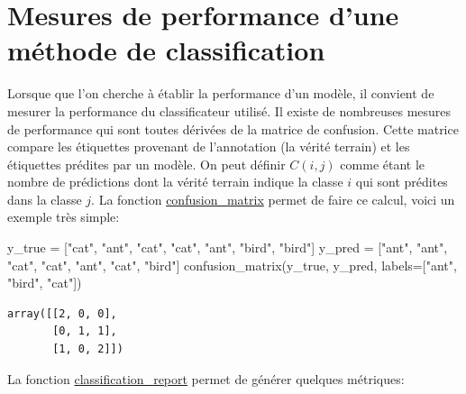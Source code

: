 \documentclass[
  11pt,
  letterpaper,
  open=any,
  twoside=false,
  french]{scrbook}
\newenvironment{Shaded}{\begin{snugshade}}{\end{snugshade}}
\newcommand{\NormalTok}[1]{\textcolor[rgb]{0.00,0.23,0.31}{#1}}
\newcommand{\OperatorTok}[1]{\textcolor[rgb]{0.37,0.37,0.37}{#1}}
\newcommand{\StringTok}[1]{\textcolor[rgb]{0.13,0.47,0.30}{#1}}
\begin{document}
\section{Mesures de performance d'une méthode de
classification}\label{mesures-de-performance-dune-muxe9thode-de-classification}

Lorsque que l'on cherche à établir la performance d'un modèle, il
convient de mesurer la performance du classificateur utilisé. Il existe
de nombreuses mesures de performance qui sont toutes dérivées de la
matrice de confusion. Cette matrice compare les étiquettes provenant de
l'annotation (la vérité terrain) et les étiquettes prédites par un
modèle. On peut définir \(C(i,j)\) comme étant le nombre de prédictions
dont la vérité terrain indique la classe \(i\) qui sont prédites dans la
classe \(j\). La fonction
\href{https://scikit-learn.org/stable/modules/generated/sklearn.metrics.confusion_matrix.html}{confusion\_matrix}
permet de faire ce calcul, voici un exemple très simple:

\begin{Shaded}
\begin{Highlighting}[]
\NormalTok{y\_true }\OperatorTok{=}\NormalTok{ [}\StringTok{"cat"}\NormalTok{, }\StringTok{"ant"}\NormalTok{, }\StringTok{"cat"}\NormalTok{, }\StringTok{"cat"}\NormalTok{, }\StringTok{"ant"}\NormalTok{, }\StringTok{"bird"}\NormalTok{, }\StringTok{"bird"}\NormalTok{]}
\NormalTok{y\_pred }\OperatorTok{=}\NormalTok{ [}\StringTok{"ant"}\NormalTok{, }\StringTok{"ant"}\NormalTok{, }\StringTok{"cat"}\NormalTok{, }\StringTok{"cat"}\NormalTok{, }\StringTok{"ant"}\NormalTok{, }\StringTok{"cat"}\NormalTok{, }\StringTok{"bird"}\NormalTok{]}
\NormalTok{confusion\_matrix(y\_true, y\_pred, labels}\OperatorTok{=}\NormalTok{[}\StringTok{"ant"}\NormalTok{, }\StringTok{"bird"}\NormalTok{, }\StringTok{"cat"}\NormalTok{])}
\end{Highlighting}
\end{Shaded}

\begin{verbatim}
array([[2, 0, 0],
       [0, 1, 1],
       [1, 0, 2]])
\end{verbatim}

La fonction
\href{https://scikit-learn.org/stable/modules/generated/sklearn.metrics.classification_report.html\#sklearn.metrics.classification_report}{classification\_report}
permet de générer quelques métriques:
\end{document}
